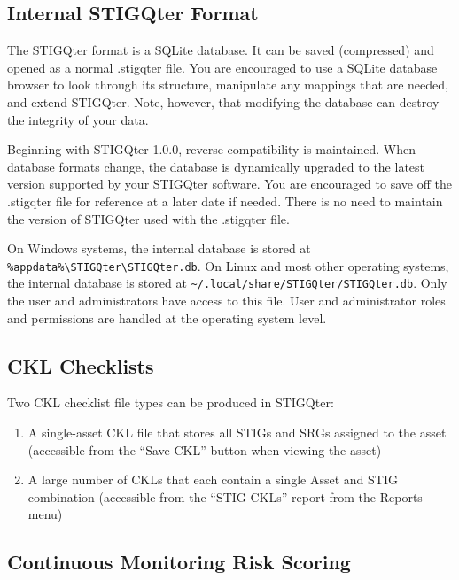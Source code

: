 \documentclass[letterpaper, 10pt, twoside]{article}
\begin{document}
\subsection{Internal STIGQter Format}

The STIGQter format is a SQLite database. It can be saved (compressed) and opened as a normal .stigqter file. You are encouraged to use a SQLite database browser to look through its structure, manipulate any mappings that are needed, and extend STIGQter. Note, however, that modifying the database can destroy the integrity of your data.

Beginning with STIGQter 1.0.0, reverse compatibility is maintained. When database formats change, the database is dynamically upgraded to the latest version supported by your STIGQter software. You are encouraged to save off the .stigqter file for reference at a later date if needed. There is no need to maintain the version of STIGQter used with the .stigqter file.

On Windows systems, the internal database is stored at \texttt{\%appdata\%\textbackslash\allowbreak STIGQter\textbackslash\allowbreak STIGQter.db}. On Linux and most other operating systems, the internal database is stored at \texttt{\textasciitilde /.local/\allowbreak share/\allowbreak STIGQter/\allowbreak STIGQter.db}. Only the user and administrators have access to this file. User and administrator roles and permissions are handled at the operating system level.

\subsection{CKL Checklists}

Two CKL checklist file types can be produced in STIGQter:

\begin{enumerate}
	\item A single-asset CKL file that stores all STIGs and SRGs assigned to the asset (accessible from the ``Save CKL'' button when viewing the asset)
	\item A large number of CKLs that each contain a single Asset and STIG combination (accessible from the ``STIG CKLs'' report from the Reports menu)
\end{enumerate}

\subsection{Continuous Monitoring Risk Scoring}
\end{document}
